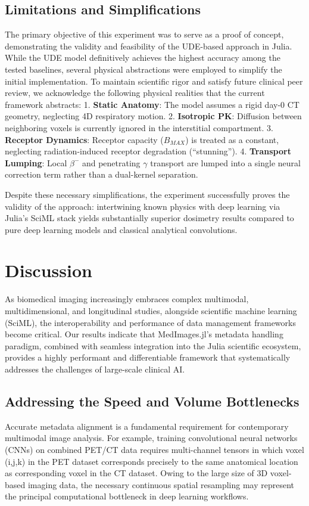 \documentclass[10pt,letterpaper]{article}
\begin{document}
\subsection{Limitations and Simplifications}
The primary objective of this experiment was to serve as a proof of concept, demonstrating the validity and feasibility of the UDE-based approach in Julia. While the UDE model definitively achieves the highest accuracy among the tested baselines, several physical abstractions were employed to simplify the initial implementation. To maintain scientific rigor and satisfy future clinical peer review, we acknowledge the following physical realities that the current framework abstracts:
1. \textbf{Static Anatomy}: The model assumes a rigid day-0 CT geometry, neglecting 4D respiratory motion.
2. \textbf{Isotropic PK}: Diffusion between neighboring voxels is currently ignored in the interstitial compartment.
3. \textbf{Receptor Dynamics}: Receptor capacity ($B_{MAX}$) is treated as a constant, neglecting radiation-induced receptor degradation (``stunning'').
4. \textbf{Transport Lumping}: Local $\beta^-$ and penetrating $\gamma$ transport are lumped into a single neural correction term rather than a dual-kernel separation.

Despite these necessary simplifications, the experiment successfully proves the validity of the approach: intertwining known physics with deep learning via Julia's SciML stack yields substantially superior dosimetry results compared to pure deep learning models and classical analytical convolutions.

\section{Discussion}

As biomedical imaging increasingly embraces complex multimodal, multidimensional, and longitudinal studies, alongside scientific machine learning (SciML), the interoperability and performance of data management frameworks become critical. Our results indicate that MedImages.jl’s metadata handling paradigm, combined with seamless integration into the Julia scientific ecosystem, provides a highly performant and differentiable framework that systematically addresses the challenges of large-scale clinical AI.

\subsection*{Addressing the Speed and Volume Bottlenecks}
Accurate metadata alignment is a fundamental requirement for contemporary multimodal image analysis. For example, training convolutional neural networks (CNNs) on combined PET/CT data requires multi-channel tensors in which voxel (i,j,k) in the PET dataset corresponds precisely to the same anatomical location as corresponding voxel in the CT dataset. Owing to the large size of 3D voxel-based imaging data, the necessary continuous spatial resampling may represent the principal computational bottleneck in deep learning workflows. 
\end{document}
